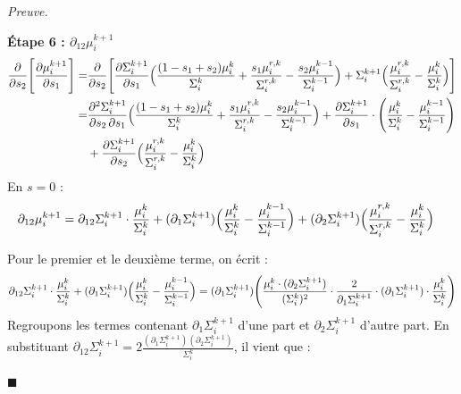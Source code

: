 \documentclass[12pt]{article}
\renewcommand{\qedsymbol}{$\blacksquare$}
\renewenvironment{proof}[1][\proofname]{%
  \par\medskip\noindent
  \textit{\color{proofgray}#1.}\enspace\ignorespaces
}{\hfill\qedsymbol\par\medskip}
\renewcommand{\proofname}{Preuve}
\begin{document}
\begin{proof}
\medskip
\textbf{Étape 6 : $\partial_{12}\mu_i^{k+1}$}
\begin{equation*}
\begin{aligned}
\frac{\partial}{\partial s_2}\Biggl[
    \frac{\partial \mu_i^{k+1}}{\partial s_1}
\Biggr] 
=& \frac{\partial}{\partial s_2}\Biggl[ 
\frac{\partial \Sigma_i^{k+1}}{\partial s_1} \Bigl( 
    \frac{(1-s_1+s_2)\mu_i^k}{\Sigma_i^{k}} + \frac{s_1\mu_i^{r,k}}{\Sigma_i^{r,k}} - \frac{s_2\mu_i^{k-1}}{\Sigma_i^{k-1}} \Bigr) 
    + \Sigma_i^{k+1} \Bigl( 
        \frac{\mu_i^{r,k}}{\Sigma_i^{r,k}} - \frac{\mu_i^{k}}{\Sigma_i^{k}}
    \Bigr)
\Biggr]\\
=& \frac{\partial^2 \Sigma_i^{k+1}}{\partial s_2\,\partial s_1 }  \Bigl( 
    \frac{(1-s_1+s_2)\mu_i^k}{\Sigma_i^{k}} + \frac{s_1\mu_i^{r,k}}{\Sigma_i^{r,k}} - \frac{s_2\mu_i^{k-1}}{\Sigma_i^{k-1}} \Bigr) 
    + \frac{\partial \Sigma_i^{k+1}}{\partial s_1} \cdot \Biggl(
        \frac{\mu_i^{k}}{\Sigma_i^{k}} - \frac{\mu_i^{k-1}}{\Sigma_i^{k-1}}
    \Biggr)\\
    &+ \frac{\partial \Sigma_i^{k+1}}{\partial s_2}  \Bigl( 
        \frac{\mu_i^{r,k}}{\Sigma_i^{r,k}} - \frac{\mu_i^{k}}{\Sigma_i^{k}}
    \Bigr)
\end{aligned}
\end{equation*}
En $s=0$ :
\begin{equation*}
    \begin{aligned}
\partial_{12} \mu_i^{k+1} &= \partial_{12} \Sigma_i^{k+1} \cdot \frac{\mu_i^k}{\Sigma_i^k} + (\partial_1 \Sigma_i^{k+1}) \Bigl(
    \frac{\mu_i^{k}}{\Sigma_i^{k}} -  \frac{\mu_i^{k-1}}{\Sigma_i^{k-1}}
\Bigr) + (\partial_2 \Sigma_i^{k+1}) \Bigl(
    \frac{\mu_i^{r,k}}{\Sigma_i^{r,k}} -  \frac{\mu_i^{k}}{\Sigma_i^{k}}
\Bigr)
    \end{aligned}
\end{equation*}

Pour le premier et le deuxième terme, on écrit :
\begin{equation*}
\partial_{12}\Sigma_i^{k+1}\cdot\frac{\mu_i^k}{\Sigma_i^k} + (\partial_1\Sigma_i^{k+1})\Bigl(\frac{\mu_i^k}{\Sigma_i^k} - \frac{\mu_i^{k-1}}{\Sigma_i^{k-1}}\Bigr) = (\partial_1\Sigma_i^{k+1})\Biggl(\frac{\mu_i^k\cdot(\partial_2\Sigma_i^{k+1})}{(\Sigma_i^k)^2}\cdot\frac{2}{\partial_1\Sigma_i^{k+1}}\cdot(\partial_1\Sigma_i^{k+1})\cdot\frac{\mu_i^k}{\Sigma_i^k}\Biggr)
\end{equation*}
Regroupons les termes contenant $\partial_1\Sigma_i^{k+1}$ d'une part et $\partial_2\Sigma_i^{k+1}$ d'autre part. 
En substituant $\partial_{12}\Sigma_i^{k+1} = 2\frac{(\partial_1\Sigma_i^{k+1})(\partial_2\Sigma_i^{k+1})}{\Sigma_i^k}$, il vient que :


\end{proof}
\end{document}

